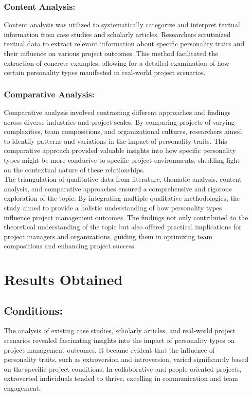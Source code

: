 \documentclass[a4Paper]{article}
\begin{document}
\subsubsection{Content Analysis: } Content analysis was utilized to systematically categorize and interpret textual information from case studies and scholarly articles. Researchers scrutinized textual data to extract relevant information about specific personality traits and their influence on various project outcomes. This method facilitated the extraction of concrete examples, allowing for a detailed examination of how certain personality types manifested in real-world project scenarios.

\subsubsection{Comparative Analysis: } Comparative analysis involved contrasting different approaches and findings across diverse industries and project scales. By comparing projects of varying complexities, team compositions, and organizational cultures, researchers aimed to identify patterns and variations in the impact of personality traits. This comparative approach provided valuable insights into how specific personality types might be more conducive to specific project environments, shedding light on the contextual nature of these relationships.\\

The triangulation of qualitative data from literature, thematic analysis, content analysis, and comparative approaches ensured a comprehensive and rigorous exploration of the topic. By integrating multiple qualitative methodologies, the study aimed to provide a holistic understanding of how personality types influence project management outcomes. The findings not only contributed to the theoretical understanding of the topic but also offered practical implications for project managers and organizations, guiding them in optimizing team compositions and enhancing project success.

\section{Results Obtained}

\subsection{Conditions: } The analysis of existing case studies, scholarly articles, and real-world project scenarios revealed fascinating insights into the impact of personality types on project management outcomes. It became evident that the influence of personality traits, such as extroversion and introversion, varied significantly based on the specific project conditions. In collaborative and people-oriented projects, extroverted individuals tended to thrive, excelling in communication and team engagement.\\
\end{document}
